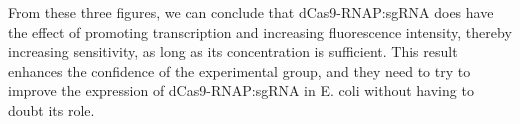 From these three figures, we can conclude that dCas9-RNAP:sgRNA does have the effect of promoting transcription and increasing fluorescence intensity, thereby increasing sensitivity, as long as its concentration is sufficient. This result enhances the confidence of the experimental group, and they need to try to improve the expression of dCas9-RNAP:sgRNA in E. coli without having to doubt its role.



